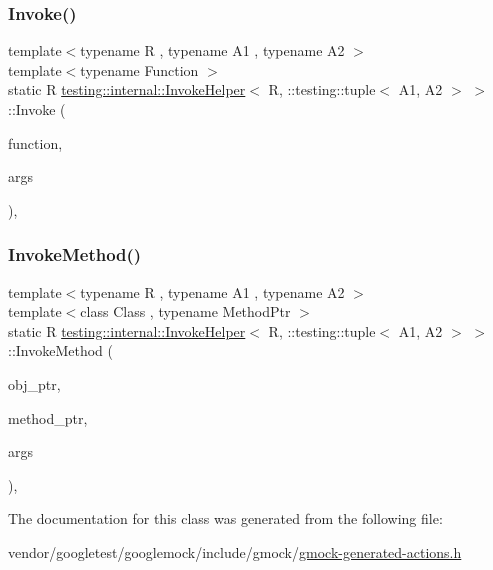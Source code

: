 \subsubsection{\texorpdfstring{Invoke()}{Invoke()}}
{\footnotesize\ttfamily template$<$typename R , typename A1 , typename A2 $>$ \\
template$<$typename Function $>$ \\
static R \hyperlink{classtesting_1_1internal_1_1_invoke_helper}{testing\+::internal\+::\+Invoke\+Helper}$<$ R, \+::testing\+::tuple$<$ A1, A2 $>$ $>$\+::Invoke (\begin{DoxyParamCaption}\item[{\hyperlink{structtesting_1_1internal_1_1_function}{Function}}]{function,  }\item[{const \+::testing\+::tuple$<$ A1, A2 $>$ \&}]{args }\end{DoxyParamCaption})\hspace{0.3cm}{\ttfamily [inline]}, {\ttfamily [static]}}

\mbox{\label{classtesting_1_1internal_1_1_invoke_helper_3_01_r_00_01_1_1testing_1_1tuple_3_01_a1_00_01_a2_01_4_01_4_a227b8f07bfda13f6cb390655fc84f1ee}} 
\subsubsection{\texorpdfstring{Invoke\+Method()}{InvokeMethod()}}
{\footnotesize\ttfamily template$<$typename R , typename A1 , typename A2 $>$ \\
template$<$class Class , typename Method\+Ptr $>$ \\
static R \hyperlink{classtesting_1_1internal_1_1_invoke_helper}{testing\+::internal\+::\+Invoke\+Helper}$<$ R, \+::testing\+::tuple$<$ A1, A2 $>$ $>$\+::Invoke\+Method (\begin{DoxyParamCaption}\item[{Class $\ast$}]{obj\+\_\+ptr,  }\item[{Method\+Ptr}]{method\+\_\+ptr,  }\item[{const \+::testing\+::tuple$<$ A1, A2 $>$ \&}]{args }\end{DoxyParamCaption})\hspace{0.3cm}{\ttfamily [inline]}, {\ttfamily [static]}}



The documentation for this class was generated from the following file\+:\begin{DoxyCompactItemize}
\item 
vendor/googletest/googlemock/include/gmock/\hyperlink{gmock-generated-actions_8h}{gmock-\/generated-\/actions.\+h}\end{DoxyCompactItemize}
